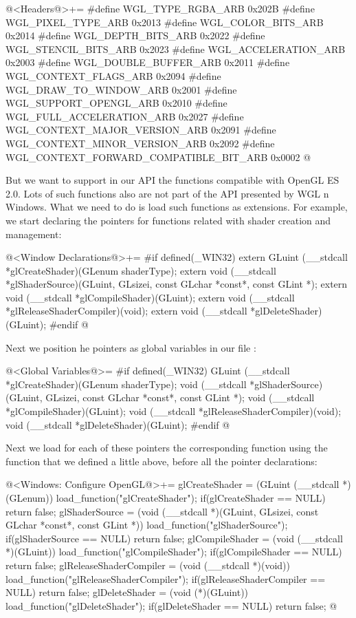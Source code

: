 \iniciocodigo
@<Headers@>+=
#define WGL_TYPE_RGBA_ARB                      0x202B
#define WGL_PIXEL_TYPE_ARB                     0x2013
#define WGL_COLOR_BITS_ARB                     0x2014
#define WGL_DEPTH_BITS_ARB                     0x2022
#define WGL_STENCIL_BITS_ARB                   0x2023
#define WGL_ACCELERATION_ARB                   0x2003
#define WGL_DOUBLE_BUFFER_ARB                  0x2011
#define WGL_CONTEXT_FLAGS_ARB                  0x2094
#define WGL_DRAW_TO_WINDOW_ARB                 0x2001
#define WGL_SUPPORT_OPENGL_ARB                 0x2010
#define WGL_FULL_ACCELERATION_ARB              0x2027
#define WGL_CONTEXT_MAJOR_VERSION_ARB          0x2091
#define WGL_CONTEXT_MINOR_VERSION_ARB          0x2092
#define WGL_CONTEXT_FORWARD_COMPATIBLE_BIT_ARB 0x0002
@
\fimcodigo

But we want to support in our API the functions compatible with OpenGL
ES 2.0. Lots of such functions also are not part of the API presented
by WGL n Windows. What we need to do is load such functions as
extensions. For example, we start declaring the pointers for functions
related with shader creation and management:

\iniciocodigo
@<Window Declarations@>+=
#if defined(_WIN32)
extern GLuint (__stdcall *glCreateShader)(GLenum shaderType);
extern void (__stdcall *glShaderSource)(GLuint, GLsizei, const GLchar *const*,
                                        const GLint *);
extern void (__stdcall *glCompileShader)(GLuint);
extern void (__stdcall *glReleaseShaderCompiler)(void);
extern void (__stdcall *glDeleteShader)(GLuint);
#endif
@
\fimcodigo

Next we position he pointers as global variables in our
file :

\iniciocodigo
@<Global Variables@>=
#if defined(_WIN32)
GLuint (__stdcall *glCreateShader)(GLenum shaderType);
void (__stdcall *glShaderSource)(GLuint, GLsizei, const GLchar *const*,
                                 const GLint *);
void (__stdcall *glCompileShader)(GLuint);
void (__stdcall *glReleaseShaderCompiler)(void);
void (__stdcall *glDeleteShader)(GLuint);
#endif
@
\fimcodigo

Next we load for each of these pointers the corresponding function
using the function that we defined a little above, before all the
pointer declarations:

\iniciocodigo
@<Windows: Configure OpenGL@>+=
glCreateShader = (GLuint (__stdcall *)(GLenum)) load_function("glCreateShader");
if(glCreateShader == NULL)
  return false;
glShaderSource = (void (__stdcall *)(GLuint, GLsizei, const GLchar *const*,
                                     const GLint *))
                 load_function("glShaderSource");
if(glShaderSource == NULL)
  return false;
glCompileShader = (void (__stdcall *)(GLuint)) load_function("glCompileShader");
if(glCompileShader == NULL)
  return false;
glReleaseShaderCompiler = (void (__stdcall *)(void))
                             load_function("glReleaseShaderCompiler");
if(glReleaseShaderCompiler == NULL)
  return false;
glDeleteShader = (void (*)(GLuint)) load_function("glDeleteShader");
if(glDeleteShader == NULL)
  return false;
@
\fimcodigo

